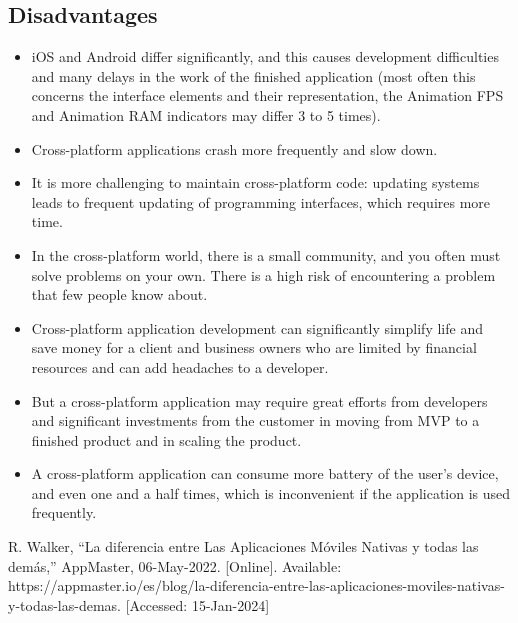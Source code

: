 \documentclass[conference]{IEEEtran}
\begin{document}
\subsection{Disadvantages}
\begin{itemize}
\item iOS and Android differ significantly, and this causes development difficulties and many delays in the work of the finished application (most often this concerns the interface elements and their representation, the Animation FPS and Animation RAM indicators may differ 3 to 5 times).

\item Cross-platform applications crash more frequently and slow down.

\item It is more challenging to maintain cross-platform code: updating systems leads to frequent updating of programming interfaces, which requires more time.

\item In the cross-platform world, there is a small community, and you often must solve problems on your own. There is a high risk of encountering a problem that few people know about.

\item Cross-platform application development can significantly simplify life and save money for a client and business owners who are limited by financial resources and can add headaches to a developer.

\item But a cross-platform application may require great efforts from developers and significant investments from the customer in moving from MVP to a finished product and in scaling the product.

\item A cross-platform application can consume more battery of the user's device, and even one and a half times, which is inconvenient if the application is used frequently.
\end{itemize}





\begin{thebibliography}{00}
 R. Walker, “La diferencia entre Las Aplicaciones Móviles Nativas y todas las demás,” AppMaster, 06-May-2022.  [Online]. Available: https://appmaster.io/es/blog/la-diferencia-entre-las-aplicaciones-moviles-nativas-y-todas-las-demas. [Accessed: 15-Jan-2024] 
\end{thebibliography}
\end{document}
